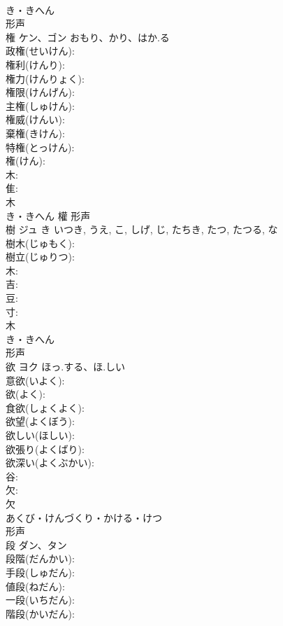 \documentclass[8pt]{extreport}
\begin{document}
\begin{CJK}{UTF8}{min}
\\	き・きへん	
\\	形声 
\\	権	ケン、ゴン	おもり、かり、はか.る		
\\	政権(せいけん): 
\\	権利(けんり): 
\\	権力(けんりょく): 
\\	権限(けんげん): 
\\	主権(しゅけん): 
\\	権威(けんい): 
\\	棄権(きけん): 
\\	特権(とっけん): 
\\	権(けん): 
\\	木: 
\\	隹: 
\\	木	
\\	き・きへん	權	形声 
\\	樹	ジュ	き	いつき, うえ, こ, しげ, じ, たちき, たつ, たつる, な	
\\	樹木(じゅもく): 
\\	樹立(じゅりつ): 
\\	木: 
\\	吉: 
\\	豆: 
\\	寸: 
\\	木	
\\	き・きへん	
\\	形声 
\\	欲	ヨク	ほっ.する、ほ.しい		
\\	意欲(いよく): 
\\	欲(よく): 
\\	食欲(しょくよく): 
\\	欲望(よくぼう): 
\\	欲しい(ほしい): 
\\	欲張り(よくばり): 
\\	欲深い(よくぶかい): 
\\	谷: 
\\	欠: 
\\	欠	
\\	あくび・けんづくり・かける・けつ	
\\	形声 
\\	段	ダン、タン			
\\	段階(だんかい): 
\\	手段(しゅだん): 
\\	値段(ねだん): 
\\	一段(いちだん): 
\\	階段(かいだん): 

\end{CJK}
\end{document}
